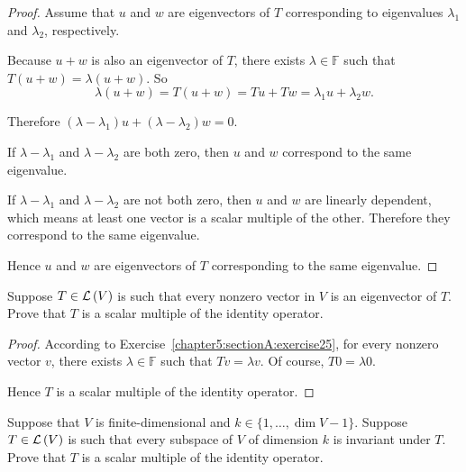 \begin{proof}
    Assume that $u$ and $w$ are eigenvectors of $T$ corresponding to eigenvalues $\lambda_{1}$ and $\lambda_{2}$, respectively.

    Because $u + w$ is also an eigenvector of $T$, there exists $\lambda\in\mathbb{F}$ such that $T(u + w) = \lambda(u + w)$. So
    \[
        \lambda(u + w) = T(u + w) = Tu + Tw = \lambda_{1}u + \lambda_{2}w.
    \]

    Therefore $(\lambda - \lambda_{1})u + (\lambda - \lambda_{2})w = 0$.

    If $\lambda - \lambda_{1}$ and $\lambda - \lambda_{2}$ are both zero, then $u$ and $w$ correspond to the same eigenvalue.

    If $\lambda - \lambda_{1}$ and $\lambda - \lambda_{2}$ are not both zero, then $u$ and $w$ are linearly dependent, which means at least one vector is a scalar multiple of the other. Therefore they correspond to the same eigenvalue.

    Hence $u$ and $w$ are eigenvectors of $T$ corresponding to the same eigenvalue.
\end{proof}
\newpage

\begin{exercise}\label{chapter5:sectionA:exercise26}
    Suppose $T \in \mathcal{L}\left({V}\right)$ is such that every nonzero vector in $V$ is an eigenvector of $T$. Prove that $T$ is a scalar multiple of the identity operator.
\end{exercise}

\begin{proof}
    According to Exercise~\ref{chapter5:sectionA:exercise25}, for every nonzero vector $v$, there exists $\lambda\in\mathbb{F}$ such that $Tv = \lambda v$. Of course, $T0 = \lambda 0$.

    Hence $T$ is a scalar multiple of the identity operator.
\end{proof}
\newpage

\begin{exercise}
    Suppose that $V$ is finite-dimensional and $k \in \{1, \ldots, \dim V - 1\}$. Suppose $T \in \mathcal{L}\left({V}\right)$ is such that every subspace of $V$ of dimension $k$ is invariant under $T$. Prove that $T$ is a scalar multiple of the identity operator.
\end{exercise}

